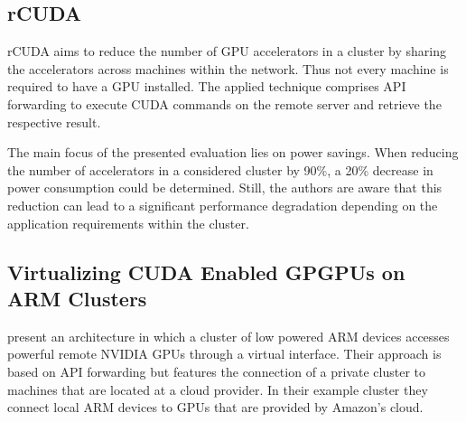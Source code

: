\subsection*{rCUDA}

rCUDA aims to reduce the number of GPU accelerators in a cluster by sharing the accelerators across machines within the network\cite{rcuda}. Thus not every machine is required to have a GPU installed. The applied technique comprises API forwarding to execute CUDA commands on the remote server and retrieve the respective result.

The main focus of the presented evaluation lies on power savings. When reducing the number of accelerators in a considered cluster by 90\%, a 20\% decrease in power consumption could be determined. Still, the authors are aware that this reduction can lead to a significant performance degradation depending on the application requirements within the cluster.

\subsection*{Virtualizing CUDA Enabled GPGPUs on ARM Clusters}

\citeauthor{arm_virtual_cuda} present an architecture in which a cluster of low powered ARM devices accesses powerful remote NVIDIA GPUs through a virtual interface\cite{arm_virtual_cuda}. Their approach is based on API forwarding but features the connection of a private cluster to machines that are located at a cloud provider. In their example cluster they connect local ARM devices to GPUs that are provided by Amazon's cloud.
